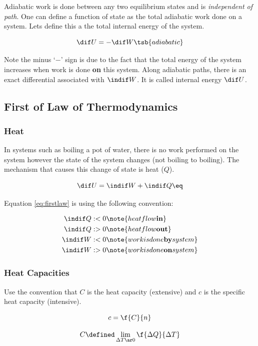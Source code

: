 \documentclass{article}
\begin{document}
Adiabatic work is done between any two equilibrium states and is \textit{independent of path}. One can define a function of state as the total adiabatic work done on a system. Lets define this a the total internal energy of the system.

\[ \dif U = - \dif W\tsb{adiabatic}\]

Note the minus `$-$' sign is due to the fact that the total energy of the system increases when work is done \textbf{on} this system. Along adiabatic paths, there is an exact differential associated with $\indif W$. It is called internal energy $\dif U$.

\subsection{First of Law of Thermodynamics}

\subsubsection{Heat}

In systems such as boiling a pot of water, there is no work performed on the system however the state of the system changes (not boiling to boiling). The mechanism that causes this change of state is heat ($Q$).

\[ \dif U = \indif W + \indif Q \eq \label{eq:firstlaw} \]

Equation \eqref{eq:firstlaw} is using the following convention:

\begin{align*}
        \indif Q &:< 0 \note{heat flow \textbf{in}} \\
        \indif Q &:> 0 \note{heat flow \textbf{out}} \\
        \indif W &:< 0 \note{work is done \textbf{by} system} \\
        \indif W &:> 0 \note{work is done \textbf{on} system} \\
\end{align*}

\subsubsection{Heat Capacities}

Use the convention that $C$ is the heat capacity (extensive) and $c$ is the specific heat capacity (intensive).

\[ c = \f{C}{n} \]

\[ C \defined \lim_{\Delta T \ar 0} \f{\Delta Q}{\Delta T} \]
\end{document}
